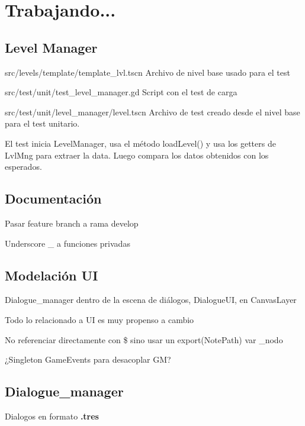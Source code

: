 
\section{Trabajando...}\label{Trabajando}

\subsection{Level Manager}

src/levels/template/template\_lvl.tscn Archivo de nivel base usado para el test

src/test/unit/test\_level\_manager.gd Script con el test de carga

src/test/unit/level\_manager/level.tscn Archivo de test creado desde el nivel base para el test unitario.

El test inicia LevelManager, usa el método loadLevel() y usa los getters de LvlMng para extraer la data. Luego compara los datos obtenidos con los esperados.


\subsection{Documentación}

Pasar feature branch a rama develop

Underscore \_ a funciones privadas

\subsection{Modelación UI}

Dialogue\_manager dentro de la escena de diálogos, DialogueUI, en CanvasLayer

Todo lo relacionado a UI es muy propenso a cambio

No referenciar directamente con \$ sino usar un export(NotePath) var \_nodo

¿Singleton GameEvents para desacoplar GM?

\subsection{Dialogue\_manager}

Dialogos en formato \textbf{.tres}

